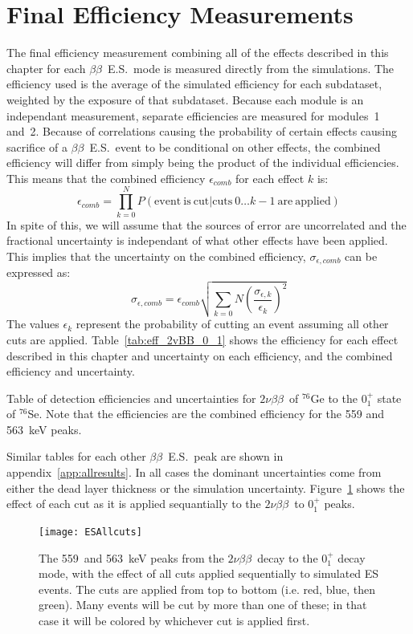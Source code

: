 \documentclass[notitlepage,rmp,aps,10pt]{revtex4-1}
\newcommand{\bb}{${\beta \beta}$}
\newcommand{\tnbb}{${2 \nu \beta \beta}$}
\newcommand{\bbes}{\bb~E.S.}
\newcommand{\iso}[2]{$^{#1}$#2}
\newcommand{\Ge}[1]{\iso{#1}{Ge}}
\newcommand{\Se}[1]{\iso{#1}{Se}}
\newcommand{\SP}[3]{$#1^{#2}_{#3}$}
\begin{document}
\section{Final Efficiency Measurements}
The final efficiency measurement combining all of the effects described in this chapter for each \bbes\ mode is measured directly from the simulations.
The efficiency used is the average of the simulated efficiency for each subdataset, weighted by the exposure of that subdataset.
Because each module is an independant measurement, separate efficiencies are measured for modules~1 and~2.
Because of correlations causing the probability of certain effects causing sacrifice of a \bbes\ event to be conditional on other effects, the combined efficiency will differ from simply being the product of the individual efficiencies.
This means that the combined efficiency $\epsilon_{comb}$ for each effect $k$ is:
\begin{equation}
  \epsilon_{comb} = \prod_{k=0}^N P(\mathrm{event~is~cut} | \mathrm{cuts~} 0\dots k-1 \mathrm{~are~applied})
\end{equation}
In spite of this, we will assume that the sources of error are uncorrelated and the fractional uncertainty is independant of what other effects have been applied.
This implies that the uncertainty on the combined efficiency, $\sigma_{\epsilon,comb}$ can be expressed as:
\begin{equation}
  \sigma_{\epsilon,comb}=\epsilon_{comb} \sqrt{ \sum_{k=0}{N} (\frac{\sigma_{\epsilon,k}}{\epsilon_k})^2 }
\end{equation}
The values $\epsilon_k$ represent the probability of cutting an event assuming all other cuts are applied.
Table~\ref{tab:eff_2vBB_0_1} shows the efficiency for each effect described in this chapter and uncertainty on each efficiency, and the combined efficiency and uncertainty.
\begin{table}[h]
  \centering
  
  \caption[Detection efficiency summary for \tnbb\ to the \SP{0}{+}{1} state of \Se{76}]{\label{tab:eff_2vBB_0_1}
    Table of detection efficiencies and uncertainties for \tnbb\ of \Ge{76} to the \SP{0}{+}{1} state of \Se{76}. Note that the efficiencies are the combined efficiency for the 559 and 563~keV peaks.
  }
\end{table}
Similar tables for each other \bbes\ peak are shown in appendix~\ref{app:allresults}.
In all cases the dominant uncertainties come from either the dead layer thickness or the simulation uncertainty.
Figure~\ref{fig:escuteffects} shows the effect of each cut as it is applied sequantially to the \tnbb\ to \SP{0}{+}{1} peaks.
\begin{figure}[htb]
  \centering
  \texttt{[image: ESAllcuts]}
  \caption[Simulated \tnbb to \SP{0}{+}{1} peaks with cuts applied]{\label{fig:escuteffects}
    The 559~and 563~keV peaks from the \tnbb\ decay to the \SP{0}{+}{1} decay mode, with the effect of all cuts applied sequentially to simulated ES events. The cuts are applied from top to bottom (i.e. red, blue, then green). Many events will be cut by more than one of these; in that case it will be colored by whichever cut is applied first. 
  }
\end{figure}
\end{document}
